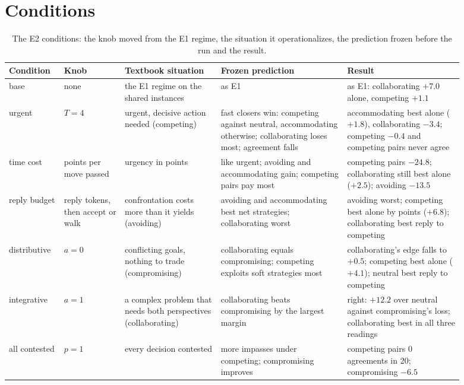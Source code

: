 \section{Conditions}
\label{app:conditions}
\begin{table}[H]
\caption{The E2 conditions: the knob moved from the E1 regime, the \tki{} situation it operationalizes, the prediction frozen before the run and the result.}
\label{tab:conditions}
\centering\small
\begin{tabular}{@{}>{\raggedright\arraybackslash}p{0.10\linewidth}>{\raggedright\arraybackslash}p{0.12\linewidth}>{\raggedright\arraybackslash}p{0.19\linewidth}>{\raggedright\arraybackslash}p{0.25\linewidth}>{\raggedright\arraybackslash}p{0.23\linewidth}@{}}
\toprule
Condition & Knob & Textbook situation & Frozen prediction & Result \\
\midrule
base & none & the E1 regime on the shared instances & as E1 & as E1: collaborating $+7.0$ alone, competing $+1.1$ \\
urgent & $T = 4$ & urgent, decisive action needed (competing) & fast closers win: competing against neutral, accommodating otherwise; collaborating loses most; agreement falls & accommodating best alone ($+1.8$), collaborating $-3.4$; competing $-0.4$ and competing pairs never agree \\
time cost & 3 points per move passed & urgency in points & like urgent; avoiding and accommodating gain; competing pairs pay most & competing pairs $-24.8$; collaborating still best alone ($+2.5$); avoiding $-13.5$ \\
reply budget & 250 reply tokens, then accept or walk & confrontation costs more than it yields (avoiding) & avoiding and accommodating best net strategies; collaborating worst & avoiding worst; competing best alone by points ($+6.8$); collaborating best reply to competing \\
distributive & $a = 0$ & conflicting goals, nothing to trade (compromising) & collaborating equals compromising; competing exploits soft strategies most & collaborating's edge falls to $+0.5$; competing best alone ($+4.1$); neutral best reply to competing \\
integrative & $a = 1$ & a complex problem that needs both perspectives (collaborating) & collaborating beats compromising by the largest margin & right: $+12.2$ over neutral against compromising's loss; collaborating best in all three readings \\
all contested & $p = 1$ & every decision contested & more impasses under competing; compromising improves & competing pairs 0 agreements in 20; compromising $-6.5$ \\

\end{tabular}
\end{table}
